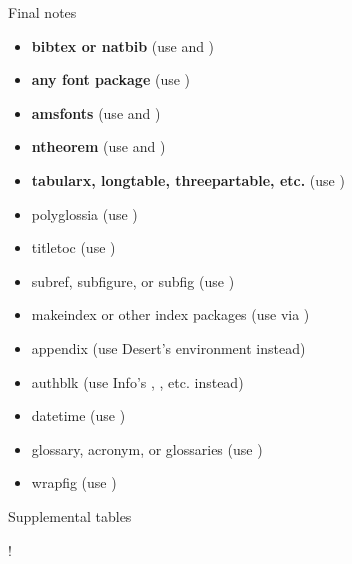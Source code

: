
\ShowBackBib  %

\begin{Appendices}

\begin {Appendix} {Final notes}

\begin{itemize}
\item \textbf{bibtex or natbib} (use  and )
\item \textbf{any font package} (use )
\item \textbf{amsfonts} (use  and )
\item \textbf{ntheorem} (use  and )
\item \textbf{tabularx, longtable, threepartable, etc.} (use )
\item polyglossia (use )
\item titletoc (use )
\item subref, subfigure, or subfig (use )
\item makeindex or other index packages (use  via )
\item appendix (use Desert's environment instead)
\item authblk (use Info's , , etc. instead)
\item datetime (use )
\item glossary, acronym, or glossaries (use )
\item wrapfig (use )
\end{itemize}

\end {Appendix}

\begin{Appendix}{Supplemental tables}
\end{Appendix}

\ShowListOfCode!
\end{Appendices}

\ShowIndex
